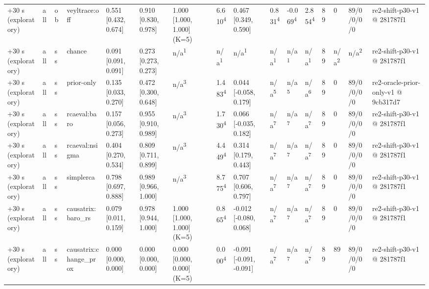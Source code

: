 \begin{table}[t]
\begin{tabular}{llllllllllllllll}
+30 s (exploratory) & all & ob & veyltrace:off & 0.551 [0.432, 0.674] & 0.910 [0.830, 0.978] & 1.000 [1.000, 1.000] (K=5) & 6.610\textsuperscript{4} & 0.467 [0.349, 0.590] & 0.831\textsuperscript{4} & -0.069\textsuperscript{4} & 2.854\textsuperscript{4} & 89 & 0 & 89/0/0/0/0 & re2-shift-p30-v1 @ 281787f1 \\
+30 s (exploratory) & all & ss & chance & 0.091 [0.091, 0.091] & 0.273 [0.273, 0.273] & n/a\textsuperscript{1} & n/a\textsuperscript{1} & n/a\textsuperscript{1} & n/a\textsuperscript{1} & n/a\textsuperscript{1} & n/a\textsuperscript{1} & 89 & n/a\textsuperscript{2} & n/a\textsuperscript{2} & re2-shift-p30-v1 @ 281787f1 \\
+30 s (exploratory) & all & ss & prior-only & 0.135 [0.033, 0.270] & 0.472 [0.300, 0.648] & n/a\textsuperscript{3} & 1.483\textsuperscript{4} & 0.044 [-0.058, 0.179] & n/a\textsuperscript{5} & n/a\textsuperscript{5} & n/a\textsuperscript{6} & 89 & 0 & 89/0/0/0/0 & re2-oracle-prior-only-v1 @ 9cb317d7 \\
+30 s (exploratory) & all & ss & rcaeval:baro & 0.157 [0.056, 0.273] & 0.955 [0.910, 0.989] & n/a\textsuperscript{3} & 1.730\textsuperscript{4} & 0.066 [-0.035, 0.182] & n/a\textsuperscript{7} & n/a\textsuperscript{7} & n/a\textsuperscript{7} & 89 & 0 & 89/0/0/0/0 & re2-shift-p30-v1 @ 281787f1 \\
+30 s (exploratory) & all & ss & rcaeval:nsigma & 0.404 [0.270, 0.534] & 0.809 [0.711, 0.899] & n/a\textsuperscript{3} & 4.449\textsuperscript{4} & 0.314 [0.179, 0.443] & n/a\textsuperscript{7} & n/a\textsuperscript{7} & n/a\textsuperscript{7} & 89 & 0 & 89/0/0/0/0 & re2-shift-p30-v1 @ 281787f1 \\
+30 s (exploratory) & all & ss & simplerca & 0.798 [0.697, 0.888] & 0.989 [0.966, 1.000] & n/a\textsuperscript{3} & 8.775\textsuperscript{4} & 0.707 [0.606, 0.797] & n/a\textsuperscript{7} & n/a\textsuperscript{7} & n/a\textsuperscript{7} & 89 & 0 & 89/0/0/0/0 & re2-shift-p30-v1 @ 281787f1 \\
+30 s (exploratory) & all & ss & causatrix:baro\_rs & 0.079 [0.011, 0.159] & 0.978 [0.944, 1.000] & 1.000 [1.000, 1.000] (K=5) & 0.865\textsuperscript{4} & -0.012 [-0.080, 0.068] & n/a\textsuperscript{7} & n/a\textsuperscript{7} & n/a\textsuperscript{7} & 89 & 0 & 89/0/0/0/0 & re2-shift-p30-v1 @ 281787f1 \\
+30 s (exploratory) & all & ss & causatrix:change\_prox & 0.000 [0.000, 0.000] & 0.000 [0.000, 0.000] & 0.000 [0.000, 0.000] (K=5) & 0.000\textsuperscript{4} & -0.091 [-0.091, -0.091] & n/a\textsuperscript{7} & n/a\textsuperscript{7} & n/a\textsuperscript{7} & 89 & 89 & 89/0/0/0/0 & re2-shift-p30-v1 @ 281787f1 \\

\end{tabular}
\end{table}

